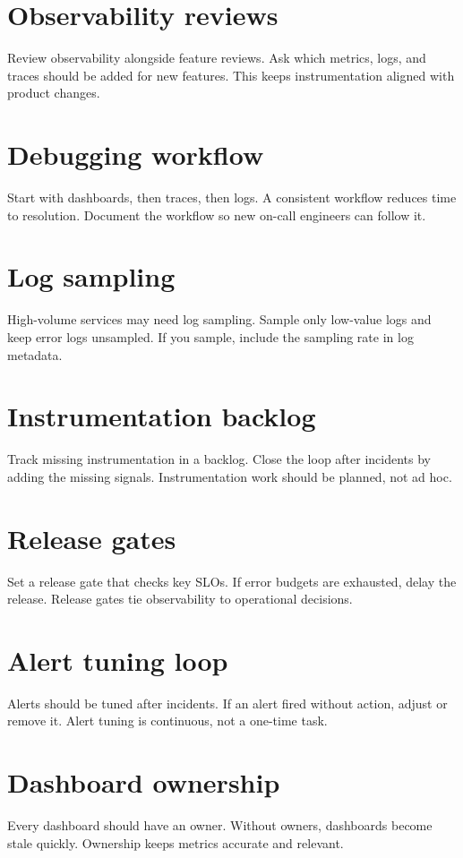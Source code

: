 \section{Observability reviews}
Review observability alongside feature reviews.
Ask which metrics, logs, and traces should be added for new features.
This keeps instrumentation aligned with product changes.

\section{Debugging workflow}
Start with dashboards, then traces, then logs.
A consistent workflow reduces time to resolution.
Document the workflow so new on-call engineers can follow it.

\section{Log sampling}
High-volume services may need log sampling.
Sample only low-value logs and keep error logs unsampled.
If you sample, include the sampling rate in log metadata.

\section{Instrumentation backlog}
Track missing instrumentation in a backlog.
Close the loop after incidents by adding the missing signals.
Instrumentation work should be planned, not ad hoc.

\section{Release gates}
Set a release gate that checks key SLOs.
If error budgets are exhausted, delay the release.
Release gates tie observability to operational decisions.

\section{Alert tuning loop}
Alerts should be tuned after incidents.
If an alert fired without action, adjust or remove it.
Alert tuning is continuous, not a one-time task.

\section{Dashboard ownership}
Every dashboard should have an owner.
Without owners, dashboards become stale quickly.
Ownership keeps metrics accurate and relevant.

